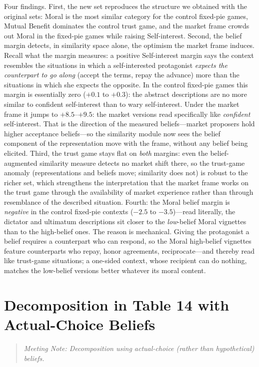 \documentclass[11pt]{article}
\begin{document}
Four findings. First, the new set reproduces the structure we obtained with the original sets: Moral is the
most similar category for the control fixed-pie games, Mutual Benefit
dominates the control trust game, and the market frame crowds
out Moral in the fixed-pie games while raising Self-interest. Second, the belief margin detects, in similarity space alone, the optimism the market
frame induces. Recall what the margin measures: a positive Self-interest margin says
the context resembles the situations in which a self-interested protagonist
\emph{expects the counterpart to go along} (accept the terms, repay the advance) more
than the situations in which she expects the opposite. In the control fixed-pie games
this margin is essentially zero ($+0.1$ to $+0.3$): the abstract descriptions are no
more similar to confident self-interest than to wary self-interest. Under the market
frame it jumps to $+8.5$--$+9.5$: the market versions read specifically like
\emph{confident} self-interest. That is the direction of the measured beliefs---market
proposers hold higher acceptance beliefs---so the similarity module now sees the
belief component of the representation move with the frame, without any belief being
elicited. Third, the trust game stays flat on \emph{both} margins: even the
belief-augmented similarity measure detects no market shift there, so the trust-game
anomaly (representations and beliefs move; similarity does not) is robust to the richer
set, which strengthens the interpretation that the market frame works on the trust game
through the availability of market experience rather than through resemblance of the
described situation. Fourth: the Moral belief margin is
\emph{negative} in the control fixed-pie contexts ($-2.5$ to $-3.5$)---read literally,
the dictator and ultimatum descriptions sit closer to the \emph{low}-belief Moral
vignettes than to the high-belief ones. The reason is mechanical.
Giving the protagonist a belief requires a counterpart who can respond, so the Moral
high-belief vignettes feature counterparts who repay, honor agreements,
reciprocate---and thereby read like trust-game situations; a one-sided context, whose
recipient can do nothing, matches the low-belief versions better whatever its moral
content. 

\section{Decomposition in Table 14 with Actual-Choice Beliefs}

\begin{quote}\itshape
Meeting Note: Decomposition using actual-choice (rather than hypothetical) beliefs.
\end{quote}
\end{document}
